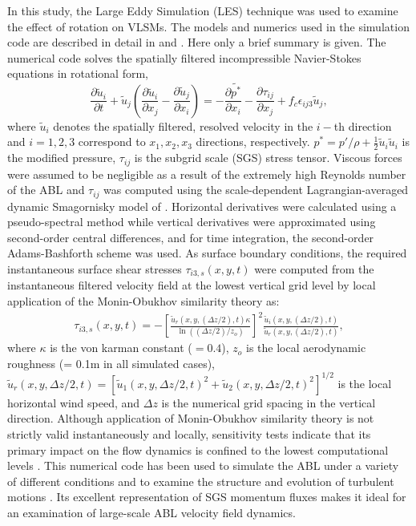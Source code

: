 In this study, the Large Eddy Simulation (LES) technique was used to examine the effect of rotation on VLSMs. The models and numerics used in the simulation code are described in detail in \citet{stoll_wrr_2006} and \citet{stoll_blm_2008}.  Here only a brief summary is given.  The numerical code solves the spatially filtered incompressible Navier-Stokes equations in rotational form,
\begin{equation}
    \frac{\partial \tilde{u}_i}{\partial t}+ \tilde{u}_j\left(\frac{\partial \tilde{u}_i}{\partial x_{j}} -\frac{\partial \tilde{u}_j}{\partial x_{i}} \right)  = -\frac{\partial \tilde{p^*}}{\partial x_i}-\frac{\partial \tau_{ij}}{\partial x_j}+f_{c}\epsilon_{ij3}\tilde{u}_{j},  
\label{eqn:les_eqn}
\end{equation}
\noindent where $\tilde{u}_i$ denotes the spatially filtered, resolved velocity in the $i-$th direction and $i=1, 2, 3$ correspond to $x_1, x_2, x_3$ directions, respectively. $p^{*}=p'/\rho + \frac{1}{2}\tilde{u}_i\tilde{u}_i$ is the modified pressure, $\tau_{ij}$ is the subgrid scale (SGS) stress tensor. Viscous forces were assumed to be negligible as a result of the extremely high Reynolds number of the ABL and $\tau_{ij}$ was computed using the scale-dependent Lagrangian-averaged dynamic Smagornisky model of \citet{stoll_wrr_2006}. Horizontal derivatives were calculated using a pseudo-spectral method while vertical derivatives were approximated using second-order central differences, and for time integration, the second-order Adams-Bashforth scheme was used. As surface boundary conditions, the required instantaneous surface shear stresses $\tau_{i3,s}(x,y,t)$  were computed from the instantaneous filtered velocity field at the lowest vertical grid level by local application of the Monin-Obukhov similarity theory \citep{stoll_blm_2006} as:
\begin{align}
\tau_{i3,s}(x,y,t) = -\left [ \frac{\tilde{u}_r(x,y,(\Delta z/2),t)\kappa}{\ln((\Delta z/2)/z_o)} \right ]^2\frac{\tilde{u}_i(x,y,(\Delta z/2),t)}{\tilde{u}_r(x,y,(\Delta z/2),t)}, 
\end{align}
\noindent where $\kappa$ is the von karman constant ($=0.4$), $z_o$ is the local aerodynamic roughness (= 0.1m in all simulated cases), $\tilde{u}_r(x,y,\Delta z/2,t)=[\tilde{u}_1(x,y,\Delta z/2,t)^{2}+\tilde{u}_2(x,y,\Delta z/2,t)^{2}]^{1/2}$ is the local horizontal wind speed, and $\Delta z$ is the numerical grid spacing in the vertical direction. Although application of Monin-Obukhov similarity theory is not strictly valid instantaneously and locally, sensitivity tests indicate that its primary impact on the flow dynamics is confined to the lowest computational levels \citep{stoll_blm_2006}. This numerical code has been used to simulate the ABL under a variety of different conditions \citep[e.g.,][]{stoll_jas_2009,bailey_blm_2013,miller_blm_2013} and to examine the structure and evolution of turbulent motions \citep[e.g.,][]{bailey_ae_2014,bailey_jfm_2016}.  Its excellent representation of SGS momentum fluxes \citep{stoll_wrr_2006} makes it ideal for an examination of large-scale ABL velocity field dynamics.

